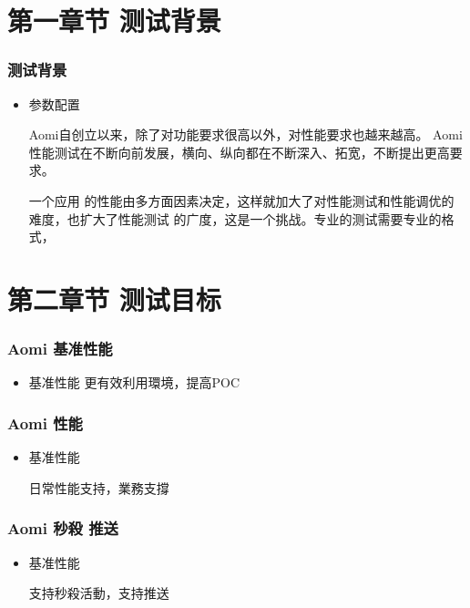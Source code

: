 \documentclass{beamer}
\begin{document}
\section{第一章节 测试背景}




\begin{frame}
\frametitle{测试背景}
\begin{itemize}
	\item 参数配置
	\small
	
	      Aomi自创立以来，除了对功能要求很高以外，对性能要求也越来越高。
      Aomi性能测试在不断向前发展，横向、纵向都在不断深入、拓宽，不断提出更高要求。
      
      
      一个应用
      的性能由多方面因素决定，这样就加大了对性能测试和性能调优的难度，也扩大了性能测试
      的广度，这是一个挑战。专业的测试需要专业的格式，	  
	    	
\end{itemize}
\end{frame}



\section{第二章节 测试目标}



\begin{frame}
\frametitle{Aomi 基准性能}
\begin{itemize}
	\item 基准性能
	\small
	  更有效利用環境，提高POC
	
	
	
	  
	
\end{itemize}
\end{frame}

\begin{frame}
\frametitle{Aomi 性能}
\begin{itemize}
	\item 基准性能
	\small
	
	日常性能支持，業務支撐
	
	
	
	
	
\end{itemize}
\end{frame}





\begin{frame}
\frametitle{Aomi 秒殺 推送}
\begin{itemize}
	\item 基准性能
	\small
	
	
	支持秒殺活動，支持推送
	
	
	
	
\end{itemize}
\end{frame}
\end{document}
